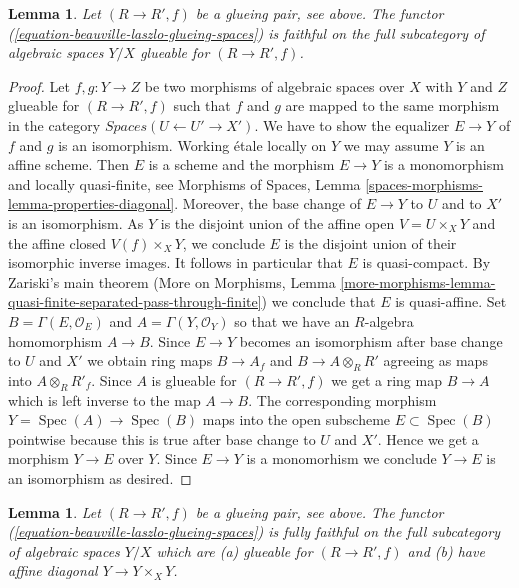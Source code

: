 \documentclass{stacks-project}
\theoremstyle{plain}
\newtheorem{lemma}[subsection]{Lemma}
\theoremstyle{definition}
\theoremstyle{remark}
\numberwithin{equation}{subsection}
\def\Spec{\mathop{\mathrm{Spec}}}
\begin{document}
\begin{lemma}
\label{lemma-glueing-f}
Let $(R \to R', f)$ be a glueing pair, see above.
The functor (\ref{equation-beauville-laszlo-glueing-spaces})
is faithful on the full subcategory of
algebraic spaces $Y/X$ glueable for $(R \to R', f)$.
\end{lemma}

\begin{proof}
Let $f, g : Y \to Z$ be two morphisms of algebraic spaces over $X$
with $Y$ and $Z$ glueable for $(R \to R', f)$ such that $f$ and $g$ are mapped
to the same morphism in the category $\textit{Spaces}(U \leftarrow U' \to X')$.
We have to show the equalizer $E \to Y$ of $f$ and $g$ is an isomorphism.
Working \'etale locally on $Y$ we may assume $Y$ is an affine scheme.
Then $E$ is a scheme and the morphism $E \to Y$ is a monomorphism
and locally quasi-finite, see Morphisms of Spaces, Lemma
\ref{spaces-morphisms-lemma-properties-diagonal}.
Moreover, the base change of $E \to Y$ to $U$ and to $X'$ is
an isomorphism. As $Y$ is the disjoint union of the affine open
$V = U \times_X Y$ and the affine closed $V(f) \times_X Y$, we conclude
$E$ is the disjoint union of their isomorphic inverse images.
It follows in particular that $E$ is quasi-compact.
By Zariski's main theorem (More on Morphisms, Lemma
\ref{more-morphisms-lemma-quasi-finite-separated-pass-through-finite})
we conclude that $E$ is quasi-affine.
Set $B = \Gamma(E, \mathcal{O}_E)$ and $A = \Gamma(Y, \mathcal{O}_Y)$
so that we have an $R$-algebra homomorphism $A \to B$.
Since $E \to Y$ becomes an isomorphism after base change to $U$ and $X'$
we obtain ring maps $B \to A_f$ and $B \to A \otimes_R R'$
agreeing as maps into $A \otimes_R R'_f$. Since $A$ is glueable
for $(R \to R', f)$ we get a ring map $B \to A$ which is left inverse
to the map $A \to B$. The corresponding morphism $Y = \Spec(A) \to \Spec(B)$
maps into the open subscheme $E \subset \Spec(B)$ pointwise because
this is true after base change to $U$ and $X'$. Hence we get a morphism
$Y \to E$ over $Y$. Since $E \to Y$ is a monomorhism we conclude
$Y \to E$ is an isomorphism as desired.
\end{proof}

\begin{lemma}
\label{lemma-glueing-ff}
Let $(R \to R', f)$ be a glueing pair, see above.
The functor (\ref{equation-beauville-laszlo-glueing-spaces})
is fully faithful on the full subcategory of
algebraic spaces $Y/X$ which are (a) glueable for $(R \to R', f)$
and (b) have affine diagonal $Y \to Y \times_X Y$.
\end{lemma}
\end{document}
